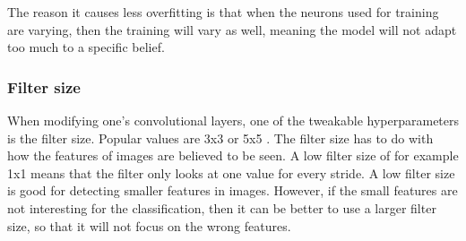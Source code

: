 
The reason it causes less overfitting is that when the neurons used for training are varying, then the training will vary as well, meaning the model will not adapt too much to a specific belief. 

\subsubsection{Filter size}
When modifying one's convolutional layers, one of the tweakable hyperparameters is the filter size. Popular values are 3x3 or 5x5 \citep{FCL}. The filter size has to do with how the features of images are believed to be seen. A low filter size of for example 1x1 means that the filter only looks at one value for every stride. A low filter size is good for detecting smaller features in images. However, if the small features are not interesting for the classification, then it can be better to use a larger filter size, so that it will not focus on the wrong features. 







